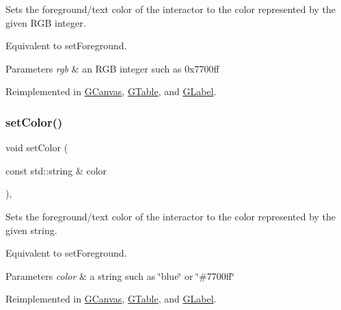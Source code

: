 Sets the foreground/text color of the interactor to the color represented by the given R\+GB integer. 

Equivalent to set\+Foreground. 
\begin{DoxyParams}{Parameters}
{\em rgb} & an R\+GB integer such as 0x7700ff \\
\hline
\end{DoxyParams}


Reimplemented in \mbox{\hyperlink{classGCanvas_a292eb0ce61f3fdb1d28b17e1e34928f7}{G\+Canvas}}, \mbox{\hyperlink{classGTable_afd1f50a2c4695c79b8633d860bce5398}{G\+Table}}, and \mbox{\hyperlink{classGLabel_afd1f50a2c4695c79b8633d860bce5398}{G\+Label}}.

\mbox{\label{classGInteractor_a61374df6c11b52cfbb0815decdbaebc6}} 
\subsubsection{\texorpdfstring{set\+Color()}{setColor()}\hspace{0.1cm}{\footnotesize\ttfamily [2/2]}}
{\footnotesize\ttfamily void set\+Color (\begin{DoxyParamCaption}\item[{const std\+::string \&}]{color }\end{DoxyParamCaption})\hspace{0.3cm}{\ttfamily [virtual]}, {\ttfamily [inherited]}}



Sets the foreground/text color of the interactor to the color represented by the given string. 

Equivalent to set\+Foreground. 
\begin{DoxyParams}{Parameters}
{\em color} & a string such as \char`\"{}blue\char`\"{} or \char`\"{}\#7700ff\char`\"{} \\
\hline
\end{DoxyParams}


Reimplemented in \mbox{\hyperlink{classGCanvas_ad148324da1b0340e84e24dffa577ffca}{G\+Canvas}}, \mbox{\hyperlink{classGTable_ad148324da1b0340e84e24dffa577ffca}{G\+Table}}, and \mbox{\hyperlink{classGLabel_ad148324da1b0340e84e24dffa577ffca}{G\+Label}}.

\mbox{\label{classGButton_ac29f9a3462458e165fae3a1f046ee77a}} 
